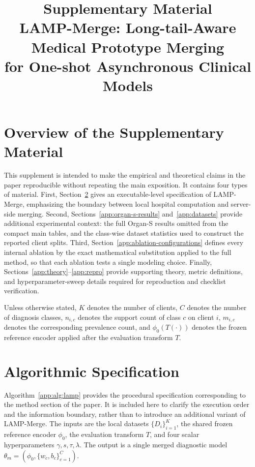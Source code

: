 \documentclass[letterpaper]{article}
\title{Supplementary Material\\[2pt]
\large LAMP-Merge: Long-tail-Aware Medical Prototype Merging\\
for One-shot Asynchronous Clinical Models}
\author{}
\date{}
\theoremstyle{definition}
\theoremstyle{plain}
\begin{document}
\maketitle
\appendix
\fi

\section{Overview of the Supplementary Material}

This supplement is intended to make the empirical and theoretical claims in the paper reproducible without repeating the main exposition. It contains four types of material. First, Section~\ref{app:algorithm} gives an executable-level specification of LAMP-Merge, emphasizing the boundary between local hospital computation and server-side merging. Second, Sections~\ref{app:organ-s-results} and~\ref{app:datasets} provide additional experimental context: the full Organ-S results omitted from the compact main tables, and the class-wise dataset statistics used to construct the reported client splits. Third, Section~\ref{app:ablation-configurations} defines every internal ablation by the exact mathematical substitution applied to the full method, so that each ablation tests a single modeling choice. Finally, Sections~\ref{app:theory}--\ref{app:repro} provide supporting theory, metric definitions, and hyperparameter-sweep details required for reproduction and checklist verification.

Unless otherwise stated, \(K\) denotes the number of clients, \(C\) denotes the number of diagnosis classes, \(n_{i,c}\) denotes the support count of class \(c\) on client \(i\), \(m_{i,c}\) denotes the corresponding prevalence count, and \(\phi_0(T(\cdot))\) denotes the frozen reference encoder applied after the evaluation transform \(T\).

\section{Algorithmic Specification}
\label{app:algorithm}

Algorithm~\ref{app:alg:lamp} provides the procedural specification corresponding to the method section of the paper. It is included here to clarify the execution order and the information boundary, rather than to introduce an additional variant of LAMP-Merge. The inputs are the local datasets \(\{D_i\}_{i=1}^{K}\), the shared frozen reference encoder \(\phi_0\), the evaluation transform \(T\), and four scalar hyperparameters \(\gamma,s,\tau,\lambda\). The output is a single merged diagnostic model \(\theta_m=(\phi_0,\{w_c,b_c\}_{c=1}^{C})\).
\end{document}
